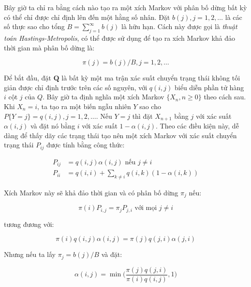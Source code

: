 \documentclass[14pt, a4paper]{article}
\numberwithin{equation}{section}
\numberwithin{figure}{section}
\theoremstyle{sltheorem}
\theoremstyle{soltheorem}
\numberwithin{dl}{section}
\numberwithin{md}{section}
\numberwithin{vd}{section}
\begin{document}
    Bây giờ ta chỉ ra bằng cách nào tạo ra một xích Markov với phân bố dừng bất kỳ có thể chỉ được chỉ định lên đến một hằng số nhân.
    Đặt $b(j), j=1, 2, \dots$ là các số thực sao cho tổng $B= \sum_{j=1}^{\infty} b(j)$ là hữu hạn.
    Cách này được gọi là \textit{thuật toán Hastings-Metropolis}, có thể được sử dụng để tạo ra xích Markov khả đảo thời gian mà phân bố dừng là:

    \begin{equation*}
        \pi (j) = b(j) / B, j = 1, 2, \dots
    \end{equation*}

    Để bắt đầu, đặt $\mathbf{Q}$ là bất kỳ một ma trận xác suất chuyển trạng thái không tối giản được chỉ định trước trên các số nguyên, với $q(i, j)$ biểu diễn phần tử hàng $i$ cột $j$ của $Q$.
    Bây giờ ta định nghĩa một xích Markov $\lbrace X_n, n \geq 0 \rbrace$ theo cách sau.
    Khi $X_n = i$, ta tạo ra một biến ngẫu nhiên $Y$ sao cho $P \lbrace Y = j \rbrace = q(i, j), j=1, 2, \dots$. Nếu $Y=j$ thì đặt $X_{n+1}$ bằng $j$ với xác suất $\alpha(i, j)$ và đặt nó bằng $i$ với xác suất $1 - \alpha(i, j)$.
    Theo các điều kiện này, dễ dàng để thấy dãy các trạng thái tạo nên một xích Markov với xác suất chuyển trạng thái $P_{ij}$ được tính bằng công thức:

    \begin{equation*}
        \begin{aligned}
            P_{ij} &= q(i, j)\alpha(i, j) \text{ nếu } j \neq i \\
            P_{ii} &= q(i, i) + \sum_{k \neq i} q(i, k)(1 - \alpha(i, k))
        \end{aligned}
    \end{equation*}

    Xích Markov này sẽ khả đảo thời gian và có phân bố dừng $\pi_j$ nếu:

    \begin{equation*}
        \pi (i) P_{i, j} = \pi_j P_{j, i} \text{ với mọi } j \neq i
    \end{equation*}

    tương đương với:

    \begin{equation} \label{eq:4.31}
        \pi (i) q(i, j) \alpha(i, j) = \pi(j) q(j, i) \alpha(j, i)
    \end{equation}

    Nhưng nếu ta lấy $\pi_j = b(j)/B$ và đặt:

    \begin{equation} \label{eq:4.32}
        \alpha(i, j) = \min \Bigg( \dfrac{\pi(j)q(j, i)}{\pi(i) q(i, j)}, 1 \Bigg)
    \end{equation}
\end{document}
